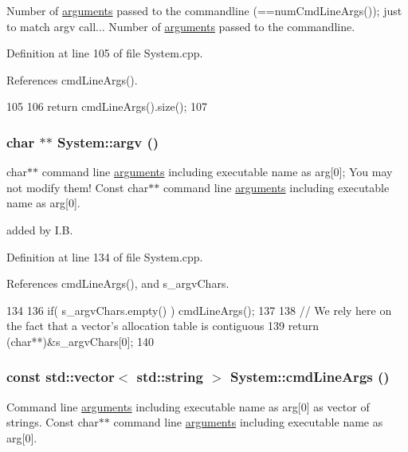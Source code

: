 Number of \hyperlink{namespacearguments}{arguments} passed to the commandline (==numCmdLineArgs()); just to match argv call... Number of \hyperlink{namespacearguments}{arguments} passed to the commandline. 

Definition at line 105 of file System.cpp.

References cmdLineArgs().


\begin{DoxyCode}
105                      {
106   return cmdLineArgs().size();
107 }
\end{DoxyCode}
\hypertarget{namespaceSystem_ae3520381fd902d4fce860586feeb6c27}{
\subsubsection[{argv}]{\setlength{\rightskip}{0pt plus 5cm}char $\ast$$\ast$ System::argv ()}}
\label{namespaceSystem_ae3520381fd902d4fce860586feeb6c27}


char$\ast$$\ast$ command line \hyperlink{namespacearguments}{arguments} including executable name as arg\mbox{[}0\mbox{]}; You may not modify them! Const char$\ast$$\ast$ command line \hyperlink{namespacearguments}{arguments} including executable name as arg\mbox{[}0\mbox{]}. 

added by I.B. 

Definition at line 134 of file System.cpp.

References cmdLineArgs(), and s\_\-argvChars.


\begin{DoxyCode}
134                        {
136   if( s_argvChars.empty() ) { cmdLineArgs(); }  
137 
138   // We rely here on the fact that a vector's allocation table is contiguous
139   return (char**)&s_argvChars[0];
140 }
\end{DoxyCode}
\hypertarget{namespaceSystem_ac5277fb525c07b07bbd94a61e62bc0f5}{
\subsubsection[{cmdLineArgs}]{\setlength{\rightskip}{0pt plus 5cm}const std::vector$<$ std::string $>$ System::cmdLineArgs ()}}
\label{namespaceSystem_ac5277fb525c07b07bbd94a61e62bc0f5}


Command line \hyperlink{namespacearguments}{arguments} including executable name as arg\mbox{[}0\mbox{]} as vector of strings. Const char$\ast$$\ast$ command line \hyperlink{namespacearguments}{arguments} including executable name as arg\mbox{[}0\mbox{]}. 

